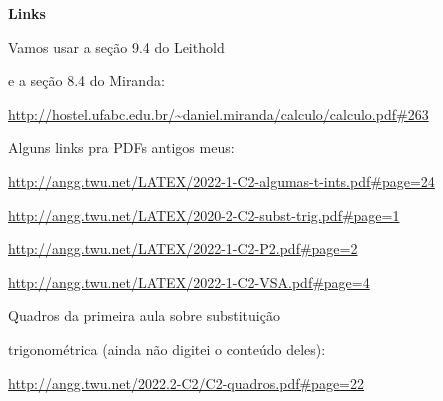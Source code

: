 \documentclass[oneside,12pt]{article}
\begin{document}
{\bf Links}


Vamos usar a seção 9.4 do Leithold


e a seção 8.4 do Miranda:

{\scriptsize

\url{http://hostel.ufabc.edu.br/~daniel.miranda/calculo/calculo.pdf\#263}

}

\ssk

Alguns links pra PDFs antigos meus:

{\scriptsize

\url{http://angg.twu.net/LATEX/2022-1-C2-algumas-t-ints.pdf#page=24}

\url{http://angg.twu.net/LATEX/2020-2-C2-subst-trig.pdf#page=1}

\url{http://angg.twu.net/LATEX/2022-1-C2-P2.pdf#page=2}

\url{http://angg.twu.net/LATEX/2022-1-C2-VSA.pdf#page=4}

}

\ssk

Quadros da primeira aula sobre substituição

trigonométrica (ainda não digitei o conteúdo deles):

{\scriptsize

\url{http://angg.twu.net/2022.2-C2/C2-quadros.pdf\#page=22}

}
\end{document}
